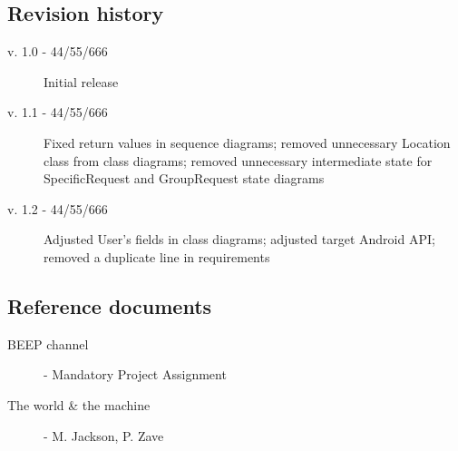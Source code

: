 \subsection{Revision history}
{
\todo
\begin{description}
    \item[v. 1.0 - 44/55/666] Initial release
	\item[v. 1.1 - 44/55/666] Fixed return values in sequence diagrams; removed unnecessary Location class from class diagrams; removed unnecessary intermediate state for SpecificRequest and GroupRequest state diagrams
	\item[v. 1.2 - 44/55/666] Adjusted User's fields in class diagrams; adjusted target Android API; removed a duplicate line in requirements
\end{description}
}
\subsection{Reference documents}
{\todo
\begin{minipage}{\textwidth}
    \begin{description}
        \item [BEEP channel] - Mandatory Project Assignment
        \item [The world \& the machine] - M. Jackson, P. Zave
    \end{description}
    \end{minipage}
}
